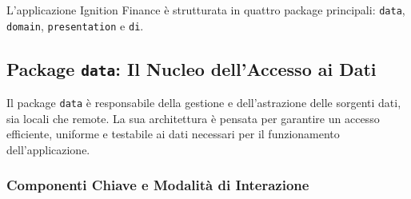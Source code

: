 L'applicazione Ignition Finance è strutturata in quattro package principali:
\texttt{data}, \texttt{domain}, \texttt{presentation} e \texttt{di}.

\subsection{Package \texttt{data}: Il Nucleo dell'Accesso ai
Dati}\label{subsec:package-texttt{data}:-il-nucleo-dell'accesso-ai-dati}

Il package \texttt{data} è responsabile della gestione e dell'astrazione delle
sorgenti dati, sia locali che remote.
La sua architettura è pensata per
garantire un accesso efficiente, uniforme e testabile ai dati necessari per il
funzionamento dell'applicazione.

\subsubsection{Componenti Chiave e Modalità di Interazione}


